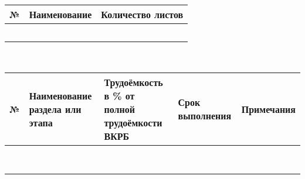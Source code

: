 \documentclass{article}
\begin{document}
\begin{center}
\makebox{\rlap{\hspace{0.5cm}} \rule[-2pt]{\linegoal}{0.5pt}} \\
\makebox{\rlap{\hspace{0.5cm}} \rule[-2pt]{\linegoal}{0.5pt}} \\
\makebox{\rlap{\hspace{0.5cm}} \rule[-2pt]{\linegoal}{0.5pt}} \\
\vspace{14pt}
 \\
\vspace{14pt}
\begin{tabularx}{\textwidth}{|l|Y|Y|}
    \hline
    \rule{0pt}{14pt}№ & Наименование & Количество листов \\    
\hline
 \rule{0pt}{14pt} & & \\
  \hline
 \rule{0pt}{14pt} & & \\
  \hline
 \rule{0pt}{14pt} & & \\
  \hline
 \rule{0pt}{14pt} & & \\
  \hline
 \rule{0pt}{14pt} & & \\
  \hline
\end{tabularx}

\vspace{14pt}
 \\
\begin{tabularx}{\textwidth}{|p{0.75cm}|Y|Y|Y|Y|}
\hline
\rule{0pt}{14pt}№ & Наименование раздела или этапа & Трудоёмкость в \% от полной трудоёмкости ВКРБ &
Срок выполнения & Примечания\\    
\hline
\rule{0pt}{14pt} & & & &\\
\hline
\rule{0pt}{14pt} & & & &\\
\hline
\rule{0pt}{14pt} & & & &\\
\hline
\rule{0pt}{14pt} & & & &\\
\hline
\rule{0pt}{14pt} & & & &\\
\hline
\rule{0pt}{14pt} & & & &\\
\hline
\rule{0pt}{14pt} & & & &\\
\hline
\rule{0pt}{14pt} & & & &\\
\hline
\end{tabularx}


\end{center}
\end{document}

